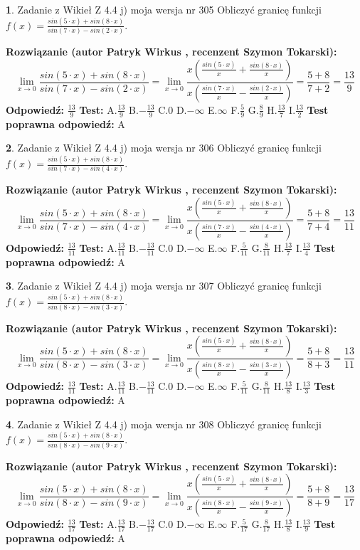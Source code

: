 \documentclass[12pt, a4paper]{article}
\theoremstyle{definition} %
\newtheorem{zad}{}
\newcommand{\zadStart}[1]{\begin{zad}#1\newline}
\newcommand{\zadStop}{\end{zad}}
\newcommand{\rozwStart}[2]{\noindent \textbf{Rozwiązanie (autor #1 , recenzent #2): }\newline}
\newcommand{\rozwStop}{\newline}
\newcommand{\odpStart}{\noindent \textbf{Odpowiedź:}\newline}
\newcommand{\odpStop}{\newline}
\newcommand{\testStart}{\noindent \textbf{Test:}\newline}
\newcommand{\testStop}{\newline}
\newcommand{\kluczStart}{\noindent \textbf{Test poprawna odpowiedź:}\newline}
\newcommand{\kluczStop}{\newline}
\begin{document}
\zadStart{Zadanie z Wikieł Z 4.4 j) moja wersja nr 305}
Obliczyć granicę funkcji $f(x)=\frac{sin(5\cdot x) +sin(8\cdot x)}{sin(7\cdot x) -sin(2\cdot x)}$.
\zadStop
\rozwStart{Patryk Wirkus}{Szymon Tokarski}
$$\lim\limits_{x\to 0}\frac{sin(5\cdot x) +sin(8\cdot x)}{sin(7\cdot x) -sin(2\cdot x)}=\lim\limits_{x\to 0}\frac{x(\frac{sin(5\cdot x)}{x}+\frac{sin(8\cdot x)}{x})}{x(\frac{sin(7\cdot x)}{x}-\frac{sin(2\cdot x)}{x})}=\frac{5+8}{7+2} = \frac{13}{9}$$
\rozwStop
\odpStart
$\frac{13}{9}$
\odpStop
\testStart
A.$\frac{13}{9}$
B.$-\frac{13}{9}$
C.$0$
D.$-\infty$
E.$\infty$
F.$\frac{5}{9}$
G.$\frac{8}{9}$
H.$\frac{13}{7}$
I.$\frac{13}{2}$
\testStop
\kluczStart
A
\kluczStop



\zadStart{Zadanie z Wikieł Z 4.4 j) moja wersja nr 306}
Obliczyć granicę funkcji $f(x)=\frac{sin(5\cdot x) +sin(8\cdot x)}{sin(7\cdot x) -sin(4\cdot x)}$.
\zadStop
\rozwStart{Patryk Wirkus}{Szymon Tokarski}
$$\lim\limits_{x\to 0}\frac{sin(5\cdot x) +sin(8\cdot x)}{sin(7\cdot x) -sin(4\cdot x)}=\lim\limits_{x\to 0}\frac{x(\frac{sin(5\cdot x)}{x}+\frac{sin(8\cdot x)}{x})}{x(\frac{sin(7\cdot x)}{x}-\frac{sin(4\cdot x)}{x})}=\frac{5+8}{7+4} = \frac{13}{11}$$
\rozwStop
\odpStart
$\frac{13}{11}$
\odpStop
\testStart
A.$\frac{13}{11}$
B.$-\frac{13}{11}$
C.$0$
D.$-\infty$
E.$\infty$
F.$\frac{5}{11}$
G.$\frac{8}{11}$
H.$\frac{13}{7}$
I.$\frac{13}{4}$
\testStop
\kluczStart
A
\kluczStop



\zadStart{Zadanie z Wikieł Z 4.4 j) moja wersja nr 307}
Obliczyć granicę funkcji $f(x)=\frac{sin(5\cdot x) +sin(8\cdot x)}{sin(8\cdot x) -sin(3\cdot x)}$.
\zadStop
\rozwStart{Patryk Wirkus}{Szymon Tokarski}
$$\lim\limits_{x\to 0}\frac{sin(5\cdot x) +sin(8\cdot x)}{sin(8\cdot x) -sin(3\cdot x)}=\lim\limits_{x\to 0}\frac{x(\frac{sin(5\cdot x)}{x}+\frac{sin(8\cdot x)}{x})}{x(\frac{sin(8\cdot x)}{x}-\frac{sin(3\cdot x)}{x})}=\frac{5+8}{8+3} = \frac{13}{11}$$
\rozwStop
\odpStart
$\frac{13}{11}$
\odpStop
\testStart
A.$\frac{13}{11}$
B.$-\frac{13}{11}$
C.$0$
D.$-\infty$
E.$\infty$
F.$\frac{5}{11}$
G.$\frac{8}{11}$
H.$\frac{13}{8}$
I.$\frac{13}{3}$
\testStop
\kluczStart
A
\kluczStop



\zadStart{Zadanie z Wikieł Z 4.4 j) moja wersja nr 308}
Obliczyć granicę funkcji $f(x)=\frac{sin(5\cdot x) +sin(8\cdot x)}{sin(8\cdot x) -sin(9\cdot x)}$.
\zadStop
\rozwStart{Patryk Wirkus}{Szymon Tokarski}
$$\lim\limits_{x\to 0}\frac{sin(5\cdot x) +sin(8\cdot x)}{sin(8\cdot x) -sin(9\cdot x)}=\lim\limits_{x\to 0}\frac{x(\frac{sin(5\cdot x)}{x}+\frac{sin(8\cdot x)}{x})}{x(\frac{sin(8\cdot x)}{x}-\frac{sin(9\cdot x)}{x})}=\frac{5+8}{8+9} = \frac{13}{17}$$
\rozwStop
\odpStart
$\frac{13}{17}$
\odpStop
\testStart
A.$\frac{13}{17}$
B.$-\frac{13}{17}$
C.$0$
D.$-\infty$
E.$\infty$
F.$\frac{5}{17}$
G.$\frac{8}{17}$
H.$\frac{13}{8}$
I.$\frac{13}{9}$
\testStop
\kluczStart
A
\kluczStop
\end{document}
